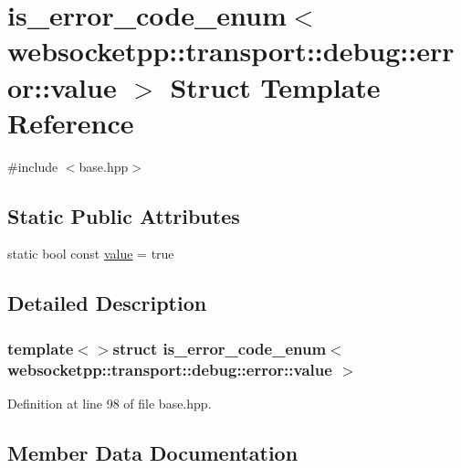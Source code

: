 \hypertarget{structis__error__code__enum_3_01websocketpp_1_1transport_1_1debug_1_1error_1_1value_01_4}{}\section{is\+\_\+error\+\_\+code\+\_\+enum$<$ websocketpp\+:\+:transport\+:\+:debug\+:\+:error\+:\+:value $>$ Struct Template Reference}
\label{structis__error__code__enum_3_01websocketpp_1_1transport_1_1debug_1_1error_1_1value_01_4}


{\ttfamily \#include $<$base.\+hpp$>$}

\subsection*{Static Public Attributes}
\begin{DoxyCompactItemize}
\item 
static bool const \hyperlink{structis__error__code__enum_3_01websocketpp_1_1transport_1_1debug_1_1error_1_1value_01_4_a9e78f2635c2c354c3e5b479cdcdc2f0b}{value} = true
\end{DoxyCompactItemize}


\subsection{Detailed Description}
\subsubsection*{template$<$$>$struct is\+\_\+error\+\_\+code\+\_\+enum$<$ websocketpp\+::transport\+::debug\+::error\+::value $>$}



Definition at line 98 of file base.\+hpp.



\subsection{Member Data Documentation}
\hypertarget{structis__error__code__enum_3_01websocketpp_1_1transport_1_1debug_1_1error_1_1value_01_4_a9e78f2635c2c354c3e5b479cdcdc2f0b}{}
